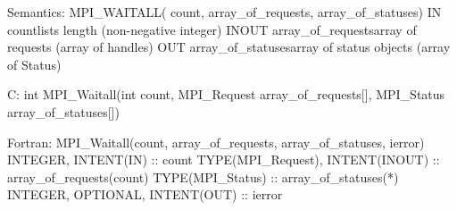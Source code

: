 Semantics:
MPI_WAITALL( count, array_of_requests, array_of_statuses)
IN countlists length (non-negative integer)
INOUT array_of_requestsarray of requests (array of handles)
OUT array_of_statusesarray of status objects (array of Status)

C:
int MPI_Waitall(int count, MPI_Request array_of_requests[], MPI_Status array_of_statuses[])

Fortran:
MPI_Waitall(count, array_of_requests, array_of_statuses, ierror)
INTEGER, INTENT(IN) :: count
TYPE(MPI_Request), INTENT(INOUT) :: array_of_requests(count)
TYPE(MPI_Status) :: array_of_statuses(*)
INTEGER, OPTIONAL, INTENT(OUT) :: ierror
